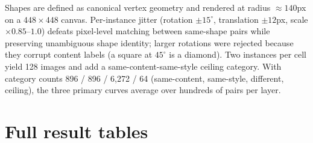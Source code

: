 \documentclass{article}
\begin{document}
Shapes are defined as canonical vertex geometry and rendered at radius
$\approx 140$px on a $448{\times}448$ canvas. Per-instance jitter
(rotation $\pm 15^{\circ}$, translation $\pm 12$px, scale
$\times 0.85$--$1.0$) defeats pixel-level matching between same-shape
pairs while preserving unambiguous shape identity; larger rotations were
rejected because they corrupt content labels (a square at $45^{\circ}$ is
a diamond). Two instances per cell yield 128 images and add a
same-content-same-style ceiling category. With category counts 896 /
896 / 6{,}272 / 64 (same-content, same-style, different, ceiling), the
three primary curves average over hundreds of pairs per layer.

\section{Full result tables}
\label{app:tables}
\end{document}
